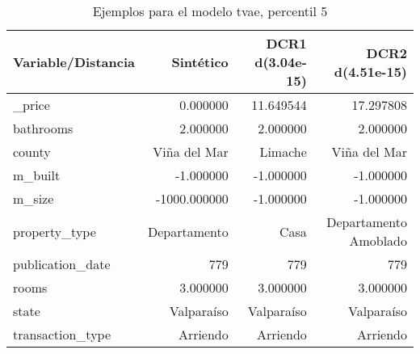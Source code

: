 \begin{table}[H]
\centering
\fontsize{10}{14}\selectfont
\caption{Ejemplos para el modelo tvae, percentil 5}
\label{table-example-economicos-b-1-tvae-5p}
\begin{tabular}{|l|r|r|r|}
\hline
\rowcolor[gray]{0.8}
Variable/Distancia & Sintético & DCR1 d(3.04e-15) & DCR2 d(4.51e-15) \\
\hline \_price & \cellcolor[rgb]{0.9, 0.54, 0.52} 0.000000 & 11.649544 & 17.297808 \\
\hline bathrooms & \cellcolor[rgb]{0.9, 0.54, 0.52} 2.000000 & \cellcolor[rgb]{0.9, 0.54, 0.52} 2.000000 & \cellcolor[rgb]{0.9, 0.54, 0.52} 2.000000 \\
\hline county & \cellcolor[rgb]{0.9, 0.54, 0.52} Viña del Mar & Limache & \cellcolor[rgb]{0.9, 0.54, 0.52} Viña del Mar \\
\hline m\_built & \cellcolor[rgb]{0.9, 0.54, 0.52} -1.000000 & \cellcolor[rgb]{0.9, 0.54, 0.52} -1.000000 & \cellcolor[rgb]{0.9, 0.54, 0.52} -1.000000 \\
\hline m\_size & \cellcolor[rgb]{0.9, 0.54, 0.52} -1000.000000 & \cellcolor[rgb]{0.9, 0.54, 0.52} -1.000000 & \cellcolor[rgb]{0.9, 0.54, 0.52} -1.000000 \\
\hline property\_type & \cellcolor[rgb]{0.9, 0.54, 0.52} Departamento & Casa & Departamento Amoblado \\
\hline publication\_date & \cellcolor[rgb]{0.9, 0.54, 0.52} 779 & \cellcolor[rgb]{0.9, 0.54, 0.52} 779 & \cellcolor[rgb]{0.9, 0.54, 0.52} 779 \\
\hline rooms & \cellcolor[rgb]{0.9, 0.54, 0.52} 3.000000 & \cellcolor[rgb]{0.9, 0.54, 0.52} 3.000000 & \cellcolor[rgb]{0.9, 0.54, 0.52} 3.000000 \\
\hline state & \cellcolor[rgb]{0.9, 0.54, 0.52} Valparaíso & \cellcolor[rgb]{0.9, 0.54, 0.52} Valparaíso & \cellcolor[rgb]{0.9, 0.54, 0.52} Valparaíso \\
\hline transaction\_type & \cellcolor[rgb]{0.9, 0.54, 0.52} Arriendo & \cellcolor[rgb]{0.9, 0.54, 0.52} Arriendo & \cellcolor[rgb]{0.9, 0.54, 0.52} Arriendo \\
\hline
\end{tabular}
\end{table}
